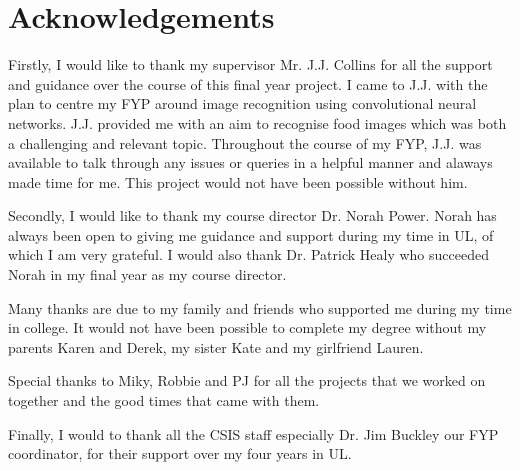 \section*{Acknowledgements}
Firstly, I would like to thank my supervisor Mr. J.J. Collins for all the support and guidance over the course of this final year project.
I came to J.J. with the plan to centre my FYP around image recognition using convolutional neural networks.
J.J. provided me with an aim to recognise food images which was both a challenging and relevant topic.
Throughout the course of my FYP, J.J. was available to talk through any issues or queries in a helpful manner and alaways made time for me.
This project would not have been possible without him.

Secondly, I would like to thank my course director Dr. Norah Power.
Norah has always been open to giving me guidance and support during my time in UL, of which I am very grateful.
I would also thank Dr. Patrick Healy who succeeded Norah in my final year as my course director.

Many thanks are due to my family and friends who supported me during my time in college.
It would not have been possible to complete my degree without my parents Karen and Derek, my sister Kate and my girlfriend Lauren.

Special thanks to Miky, Robbie and PJ for all the projects that we worked on together and the good times that came with them.

Finally, I would to thank all the CSIS staff especially Dr. Jim Buckley our FYP coordinator, for their support over my four years in UL.